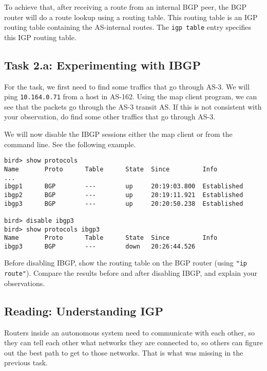 To achieve that, after receiving a route from an internal BGP peer,
the BGP router will do a route lookup using a routing table.
This routing table is an IGP routing table containing the AS-internal routes. 
The \texttt{igp table} entry specifies this IGP routing table. 



\subsection{Task 2.a: Experimenting with IBGP} 


For the task, we first need to find some traffics that 
go through AS-3. We will ping \texttt{10.164.0.71} from a host in AS-162. Using the 
map client program, we can see that the packets go through
the AS-3 transit AS. If this is not consistent with your observation,
do find some other traffics that go through AS-3. 

We will now disable the IBGP sessions either the map client or 
from the command line. See the following example.

\begin{lstlisting}
bird> show protocols
Name       Proto      Table      State  Since         Info
...
ibgp1      BGP        ---        up     20:19:03.800  Established
ibgp2      BGP        ---        up     20:19:11.921  Established
ibgp3      BGP        ---        up     20:20:50.238  Established

bird> disable ibgp3 
bird> show protocols ibgp3
Name       Proto      Table      State  Since         Info
ibgp3      BGP        ---        down   20:26:44.526
\end{lstlisting}
 
Before disabling IBGP, show the routing table 
on the BGP router (using \texttt{"ip route"}). Compare the 
results before and after disabling IBGP, and explain
your observations. 


\subsection{Reading: Understanding IGP} 

Routers inside an autonomous system need to
communicate with each other, so they can tell each other
what networks they are connected to, so others can figure out
the best path to get to those networks. That is what
was missing in the previous task.


